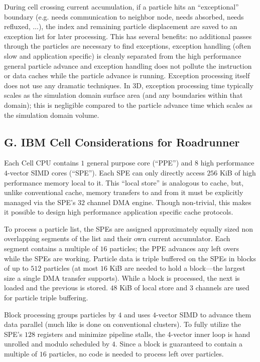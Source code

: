 \documentclass[letter,10pt]{article}
\begin{document}
During cell crossing current accumulation, if a particle hits an
``exceptional'' boundary (e.g. needs communication to neighbor node,
needs absorbed, needs refluxed, ...), the index and remaining particle
displacement are saved to an exception list for later processing.
This has several benefits: no additional passes through the particles
are necessary to find exceptions, exception handling (often slow and
application specific) is cleanly separated from the high performance
general particle advance and exception handling does not pollute the
instruction or data caches while the particle advance is running.
Exception processing itself does not use any dramatic techniques.  In
3D, exception processing time typically scales as the simulation
domain surface area (and any boundaries within that domain); this is
negligible compared to the particle advance time which scales as the
simulation domain volume.

\subsection{G. IBM Cell Considerations for Roadrunner}


Each Cell CPU contains $1$ general purpose core (``PPE'') and $8$ high
performance $4$-vector SIMD cores (``SPE'').  Each SPE can only
directly access $256$ KiB of high performance memory local to it.
This ``local store'' is analogous to cache, but, unlike conventional
cache, memory transfers to and from it must be explicitly managed via
the SPE's $32$ channel DMA engine.  Though non-trivial, this makes it
possible to design high performance application specific cache
protocols. %

To process a particle list, the SPEs are assigned approximately equally
sized non overlapping segments of the list and their own
current accumulator.  Each segment contains a
multiple of $16$ particles; the PPE advances any left overs while the
SPEs are working.  Particle data is triple buffered on the SPEs in
blocks of up to $512$ particles (at most $16$ KiB are needed to hold a
block---the largest size a single DMA transfer supports).
While a block is processed, the next is loaded and the previous is
stored.  $48$ KiB of local store and $3$ channels are used for particle
triple buffering.

Block processing groups particles by $4$ and uses $4$-vector SIMD to
advance them data parallel (much like is done on conventional
clusters).  To fully utilize the SPE's $128$ registers and minimize
pipeline stalls, the 4-vector inner loop is hand unrolled and modulo
scheduled by $4$.  Since a block is guaranteed to contain a multiple
of $16$ particles, no code is needed to process left
over particles.
\end{document}

